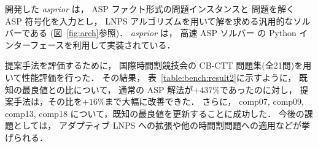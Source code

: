 開発した \textit{asprior} は，
ASP ファクト形式の問題インスタンスと
問題を解く ASP 符号化を入力とし，
LNPS アルゴリズムを用いて解を求める汎用的なソルバーである
(図~\ref{fig:arch}参照)．
\textit{asprior} は，
高速 ASP ソルバー {\clingo}%
の Python インターフェースを利用して実装されている．

提案手法を評価するために，
国際時間割競技会の CB-CTT 問題集(全21問)を用いて性能評価を行った．
その結果，
表~\ref{table:bench:result2}に示すように，
既知の最良値との比について，
通常の ASP 解法が$+437\%$であったのに対し，
提案手法は，その比を$+16\%$まで大幅に改善できた．
%
さらに，
comp07,
comp09,
comp13,
comp18
について，既知の最良値を更新することに成功した．
今後の課題としては，
アダプティブ LNPS への拡張や他の時間割問題への適用などが挙げられる．

% 

%     



